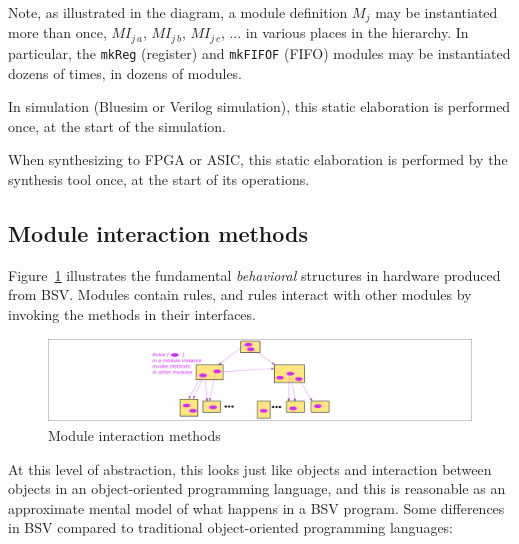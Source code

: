 Note, as illustrated in the diagram, a module definition $M_j$ may be
instantiated more than once, $MI_{j\,a}$, $MI_{j\,b}$, $MI_{j\,c}$,
... in various places in the hierarchy.  In particular, the
\verb|mkReg| (register) and \verb|mkFIFOF| (FIFO) modules may be
instantiated dozens of times, in dozens of modules.

In simulation (Bluesim or Verilog simulation), this static elaboration
is performed once, at the start of the simulation.

When synthesizing to FPGA or ASIC, this static elaboration is
performed by the synthesis tool once, at the start of its operations.


\subsection{Module interaction {\via} methods}

\label{Sec_module_interaction_via_methods}


Figure~\ref{Fig_BSV_module_interaction} illustrates the fundamental
\emph{behavioral} structures in hardware produced from BSV.  Modules
contain rules, and rules interact with other modules by invoking the
methods in their interfaces.
\begin{figure}[htbp]
  \centerline{\includegraphics[width=6in,angle=0]{Figures/Fig_BSV_module_interaction}}
  \caption{\label{Fig_BSV_module_interaction}
           Module interaction {\via} methods}
\end{figure}

At this level of abstraction, this looks just like objects and
interaction between objects in an object-oriented programming
language, and this is reasonable as an approximate mental model of
what happens in a BSV program.  Some differences in BSV compared to
traditional object-oriented programming languages:

